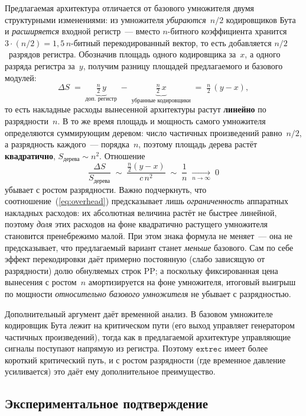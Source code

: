 \documentclass[a4paper, 12pt, oneside]{report}
\begin{document}
Предлагаемая архитектура отличается от базового умножителя двумя
структурными изменениями: из умножителя \textit{убираются}~$n/2$
кодировщиков Бута и \textit{расширяется} входной регистр~--- вместо
$n$-битного коэффициента хранится $3\cdot(n/2) = 1{,}5\,n$-битный
перекодированный вектор, то есть добавляется $n/2$~разрядов регистра.
Обозначив площадь одного кодировщика за~$x$, а одного разряда регистра
за~$y$, получим разницу площадей предлагаемого и базового модулей:
\begin{equation}
  \Delta S \;=\; \underbrace{\tfrac{n}{2}\,y}_{\text{доп. регистр}}
              \;-\; \underbrace{\tfrac{n}{2}\,x}_{\text{убранные кодировщики}}
            \;=\; \tfrac{n}{2}\,(y - x),
  \label{eq:overhead}
\end{equation}
то есть накладные расходы вынесенной архитектуры растут
\textbf{линейно} по разрядности~$n$. В то же время площадь и мощность
самого умножителя определяются суммирующим деревом: число частичных
произведений равно~$n/2$, а разрядность каждого~--- порядка~$n$, поэтому
площадь дерева растёт \textbf{квадратично}, $S_{\text{дерева}} \sim n^2$.
Отношение
\[
  \frac{\Delta S}{S_{\text{дерева}}} \;\sim\; \frac{\tfrac{n}{2}(y-x)}{c\,n^2}
  \;\sim\; \frac{1}{n} \;\xrightarrow[n\to\infty]{}\; 0
\]
убывает с ростом разрядности. Важно подчеркнуть, что
соотношение~(\ref{eq:overhead}) предсказывает лишь \textit{ограниченность}
аппаратных накладных расходов: их абсолютная величина растёт не быстрее
линейной, поэтому \textit{доля} этих расходов на фоне квадратично растущего
умножителя становится пренебрежимо малой. При этом знака формула не меняет~--- она не
предсказывает, что предлагаемый вариант станет \textit{меньше} базового.
Сам по себе эффект перекодировки даёт примерно постоянную (слабо зависящую
от разрядности) долю обнуляемых строк PP; а поскольку фиксированная цена
вынесения с ростом~$n$ амортизируется на фоне умножителя, итоговый выигрыш
по мощности \textit{относительно базового умножителя} не убывает с
разрядностью.

Дополнительный аргумент даёт временной анализ. В базовом умножителе
кодировщик Бута лежит на критическом пути (его выход управляет
генератором частичных произведений), тогда как в предлагаемой
архитектуре управляющие сигналы поступают напрямую из регистра. Поэтому
$\texttt{extrec}$ имеет более короткий критический путь, и с ростом
разрядности (где временное давление усиливается) это даёт ему
дополнительное преимущество.

\subsection{Экспериментальное подтверждение}
\end{document}
